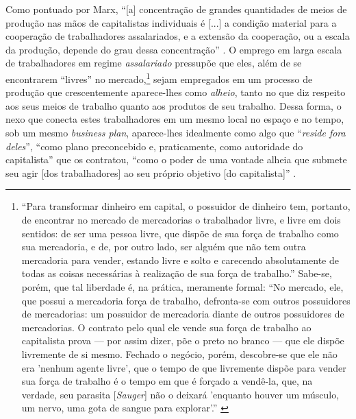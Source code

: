 Como pontuado por Marx, ``[a] concentração de grandes quantidades de meios de produção nas mãos de capitalistas individuais é [...] a condição material para a cooperação de trabalhadores assalariados, e a extensão da cooperação, ou a escala da produção, depende do grau dessa concentração'' \parencite[p. 405]{Marx2017}. O emprego em larga escala de trabalhadores em regime \textit{assalariado} pressupõe que eles, além de se encontrarem ``livres'' no mercado,\footnote{``Para transformar dinheiro em capital, o possuidor de dinheiro tem, portanto, de encontrar no mercado de mercadorias o trabalhador livre, e livre em dois sentidos: de ser uma pessoa livre, que dispõe de sua força de trabalho como sua mercadoria, e de, por outro lado, ser alguém que não tem outra mercadoria para vender, estando livre e solto e carecendo absolutamente de todas as coisas necessárias à realização de sua força de trabalho.'' \parencite[p. 244]{Marx2017} Sabe-se, porém, que tal liberdade é, na prática, meramente formal: ``No mercado, ele, que possui a mercadoria força de trabalho, defronta-se com outros possuidores de mercadorias: um possuidor de mercadoria diante de outros possuidores de mercadorias. O contrato pelo qual ele vende sua força de trabalho ao capitalista prova --- por assim dizer, põe o preto no branco --- que ele dispõe livremente de si mesmo. Fechado o negócio, porém, descobre-se que ele não era 'nenhum agente livre', que o tempo de que livremente dispõe para vender sua força de trabalho é o tempo em que é forçado a vendê-la, que, na verdade, seu parasita [\textit{Sauger}] não o deixará 'enquanto houver um músculo, um nervo, uma gota de sangue para explorar'.'' \parencite[p. 373]{Marx2017}} sejam empregados em um processo de produção que crescentemente aparece-lhes como \textit{alheio}, tanto no que diz respeito aos seus meios de trabalho quanto aos produtos de seu trabalho. Dessa forma, o nexo que conecta estes trabalhadores em um mesmo local no espaço e no tempo, sob um mesmo \textit{business plan}, aparece-lhes idealmente como algo que ``\textit{reside fora deles}'', ``como plano preconcebido e, praticamente, como autoridade do capitalista'' que os contratou, ``como o poder de uma vontade alheia que submete seu agir [dos trabalhadores] ao seu próprio objetivo [do capitalista]'' \parencite[p. 407]{Marx2017}. 

